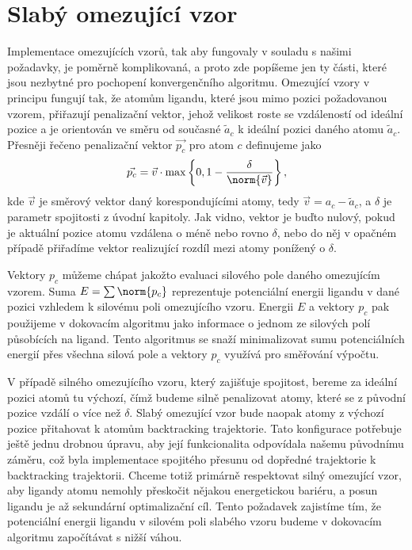 \section{Slabý omezující vzor} \label{subsec:weak_pattern}
Implementace omezujících vzorů, tak aby fungovaly v souladu s našimi požadavky,
je poměrně komplikovaná, a proto zde popíšeme jen ty části, které jsou nezbytné
pro pochopení konvergenčního algoritmu. Omezující vzory v principu fungují tak,
že atomům ligandu, které jsou mimo pozici požadovanou vzorem, přiřazují
penalizační vektor, jehož velikost roste se vzdáleností od ideální pozice
a je orientován ve směru od současné $ \tilde{a}_c $ k ideální pozici daného
atomu $ \tilde{a}_c $. Přesněji řečeno penalizační vektor $ \vec{p_c} $ pro
atom $ c $ definujeme jako
\begin{align*}
    \vec{p_c} = \vec{v} \cdot \max\left\{ 0, 1 - \frac{\delta}{\norm{\vec{v}}} \right\},
\end{align*}
kde $ \vec{v} $ je směrový vektor daný korespondujícími atomy, tedy
$ \vec{v} = a_c - \tilde{a}_c $, a $ \delta $ je parametr spojitosti z úvodní
kapitoly. Jak vidno, vektor je buďto nulový, pokud je aktuální pozice atomu vzdálena
o méně nebo rovno $ \delta $, nebo do něj v opačném případě přiřadíme vektor
realizující rozdíl mezi atomy ponížený o $ \delta $.

Vektory $ p_c $ můžeme chápat jakožto evaluaci silového pole daného omezujícím
vzorem. Suma $ E = \sum \norm{p_c} $ reprezentuje potenciální energii
ligandu v dané pozici vzhledem k silovému poli omezujícího vzoru. Energii $ E $
a vektory $ p_c $ pak použijeme v dokovacím algoritmu jako informace o jednom
ze silových polí působících na ligand. Tento algoritmus se snaží minimalizovat sumu
potenciálních energií přes všechna silová pole a vektory $ p_c $ využívá pro
směřování výpočtu.

V případě silného omezujícího vzoru, který zajišťuje spojitost, bereme za
ideální pozici atomů tu výchozí, čímž budeme silně penalizovat atomy, které se
z původní pozice vzdálí o více než $ \delta $. Slabý omezující vzor bude naopak
atomy z výchozí pozice přitahovat k atomům backtracking trajektorie. Tato konfigurace
potřebuje ještě jednu drobnou úpravu, aby její funkcionalita odpovídala našemu
původnímu záměru, což byla implementace spojitého přesunu od dopředné trajektorie
k backtracking trajektorii. Chceme totiž primárně respektovat silný omezující
vzor, aby ligandy atomu nemohly přeskočit nějakou energetickou bariéru, a posun
ligandu je až sekundární optimalizační cíl. Tento požadavek zajistíme tím, že
potenciální energii ligandu v silovém poli slabého vzoru budeme v dokovacím
algoritmu započítávat s nižší váhou.





